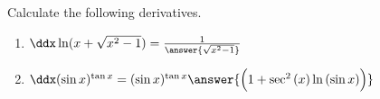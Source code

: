 \documentclass{ximera}
\author{Nela Lakos}
\begin{document}
\begin{exercise}

Calculate the following derivatives.
\begin{enumerate}
\item $\ddx\ln(x+\sqrt{x^2-1}) =\frac{1}{\answer{\sqrt{x^2-1}}}$\\
\item$ \ddx(\sin x)^{\tan{x}} = (\sin{x})^{\tan{x}}\answer{\Bigl(1+\sec^2{(x)}\ln{(\sin{x})}\Bigr)}$\\
\end{enumerate}
\end{exercise}
\end{document}
